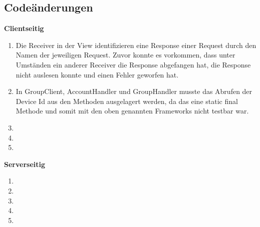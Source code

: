 \subsection{Codeänderungen}

	\textbf{Clientseitig}
	\begin{enumerate}
		\item Die Receiver in der View identifizieren eine Response einer Request durch den Namen der jeweiligen Request. Zuvor konnte es vorkommen, dass unter Umständen ein anderer Receiver die Response abgefangen hat, die Response nicht auslesen konnte und einen Fehler geworfen hat. 
		\item In GroupClient, AccountHandler und GroupHandler musste das Abrufen der Device Id aus den Methoden ausgelagert werden, da das eine static final Methode und somit mit den oben genannten Frameworks nicht testbar war.
		\item 
		\item
		\item
	\end{enumerate}

	\textbf{Serverseitig}
	\begin{enumerate}
		\item
		\item
		\item
		\item
		\item
	\end{enumerate}






